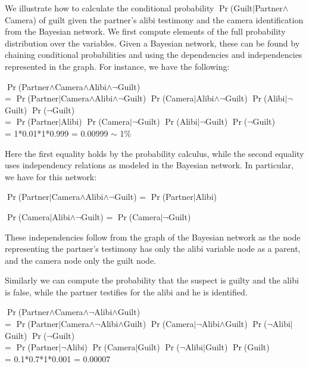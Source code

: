 \documentclass[10pt]{article}
\begin{document}
We illustrate how to calculate the conditional probability $\Pr$(Guilt$|$Partner$ \land $Camera) of guilt given the partner's alibi testimony and the camera identification from the Bayesian network. We first compute elements of the full probability distribution over the variables. Given a Bayesian network, these can be found by chaining conditional probabilities and using the dependencies and independencies represented in the graph. For instance, we have the following:

\begin{description}
	\item $\Pr$(Partner$ \land $Camera$ \land $Alibi$ \land \neg$Guilt)\\
	= $\Pr$(Partner$ | $Camera$ \land $Alibi$ \land \neg$Guilt) $\Pr$(Camera$ | $Alibi$ \land \neg$Guilt) $\Pr$(Alibi$ | \neg$Guilt) $\Pr$($\neg$Guilt)\\
	= $\Pr$(Partner$ | $Alibi) $\Pr$(Camera$ | \neg$Guilt) $\Pr$(Alibi$ | \neg$Guilt) $\Pr$($\neg$Guilt) \\
	= 1*0.01*1*0.999 = 0.00999 $\sim$ 1\%
\end{description}

\noindent Here the first equality holds by the probability calculus, while the second equality uses independency relations as modeled in the Bayesian network. In particular, we have for this network:

\begin{description}
	\item $\Pr$(Partner$ | $Camera$ \land $Alibi$ \land \neg$Guilt) = $\Pr$(Partner$ | $Alibi) 
	\item $\Pr$(Camera$ | $Alibi$ \land \neg$Guilt) = 	$\Pr$(Camera$ | \neg$Guilt) 
\end{description}

\noindent These independencies follow from the graph of the Bayesian network as the node representing the partner's testimony has only the alibi variable node as a parent, and the camera node only the guilt node.

Similarly we can compute 
the probability that the suspect is guilty and the alibi is false, while the partner testifies for the alibi and he is identified.

\begin{description}
	\item $\Pr$(Partner$ \land $Camera$ \land \neg$Alibi$ \land $Guilt)\\
	= $\Pr$(Partner$ | $Camera$ \land \neg$Alibi$ \land $Guilt) $\Pr$(Camera$ | \neg$Alibi$ \land $Guilt) $\Pr$($\neg$Alibi$ | $Guilt) $\Pr$($\neg$Guilt)\\
	= $\Pr$(Partner$ | \neg$Alibi) $\Pr$(Camera$ | $Guilt) $\Pr$($\neg$Alibi$ | $Guilt) $\Pr$(Guilt) \\
	= 0.1*0.7*1*0.001 = 0.00007
\end{description}
\end{document}
